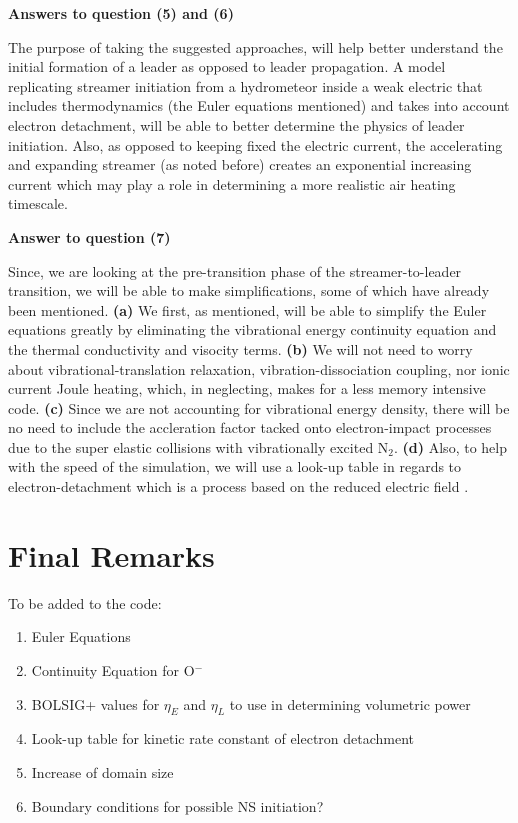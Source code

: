 \documentclass[]{article}
\begin{document}
 	\noindent \textbf{Answers to question (5) and (6)}
 	
 	The purpose of taking the suggested approaches, will help better understand the initial formation of a leader as opposed to leader propagation. A model replicating streamer initiation from a hydrometeor inside a weak electric that includes thermodynamics (the Euler equations mentioned) and takes into account electron detachment, will be able to better determine the physics of leader initiation. Also, as opposed to keeping fixed the electric current, the accelerating and expanding streamer (as noted before) creates an exponential increasing current which may play a role in determining a more realistic air heating timescale.
 	
 	\noindent \textbf{Answer to question (7)}
 	
 	Since, we are looking at the pre-transition phase of the streamer-to-leader transition, we will be able to make simplifications, some of which have already been mentioned. \textbf{(a)} We first, as mentioned, will be able to simplify the Euler equations greatly by eliminating the vibrational energy continuity equation and the thermal conductivity and visocity terms. \textbf{(b)} We will not need to worry about vibrational-translation relaxation, vibration-dissociation coupling, nor ionic current Joule heating, which, in neglecting, makes for a less memory intensive code. \textbf{(c)} Since we are not accounting for vibrational energy density, there will be no need to include the accleration factor tacked onto electron-impact processes due to the super elastic collisions with vibrationally excited N$_2$. \textbf{(d)} Also, to help with the speed of the simulation, we will use a look-up table in regards to electron-detachment which is a process based on the reduced electric field \citet{Luque:2012}.
 	
 	\section{Final Remarks}
 	
 	To be added to the code:
 	\begin{enumerate}
 		\item Euler Equations
 		\item Continuity Equation for O$^-$
 		\item BOLSIG+ values for $\eta_{E}$ and $\eta_L$ to use in determining volumetric power
 		\item Look-up table for kinetic rate constant of electron detachment
 		\item Increase of domain size
 		\item Boundary conditions for possible NS initiation?
 	\end{enumerate}
\end{document}
